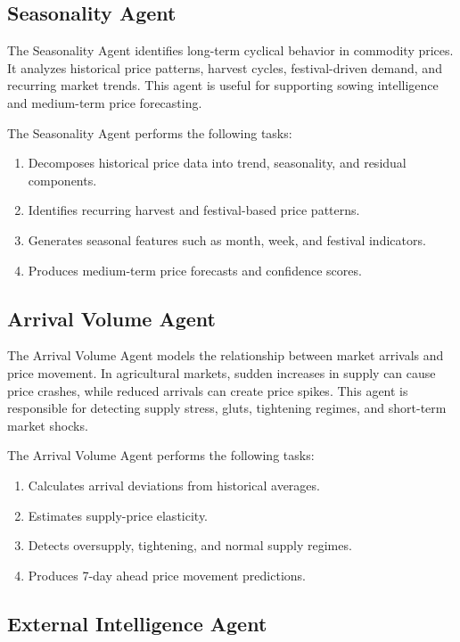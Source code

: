 \documentclass[12pt,a4paper]{report}
\begin{document}
\subsection{Seasonality Agent}

The Seasonality Agent identifies long-term cyclical behavior in commodity prices. It analyzes historical price patterns, harvest cycles, festival-driven demand, and recurring market trends. This agent is useful for supporting sowing intelligence and medium-term price forecasting.

The Seasonality Agent performs the following tasks:

\begin{enumerate}
    \item Decomposes historical price data into trend, seasonality, and residual components.
    \item Identifies recurring harvest and festival-based price patterns.
    \item Generates seasonal features such as month, week, and festival indicators.
    \item Produces medium-term price forecasts and confidence scores.
\end{enumerate}

\subsection{Arrival Volume Agent}

The Arrival Volume Agent models the relationship between market arrivals and price movement. In agricultural markets, sudden increases in supply can cause price crashes, while reduced arrivals can create price spikes. This agent is responsible for detecting supply stress, gluts, tightening regimes, and short-term market shocks.

The Arrival Volume Agent performs the following tasks:

\begin{enumerate}
    \item Calculates arrival deviations from historical averages.
    \item Estimates supply-price elasticity.
    \item Detects oversupply, tightening, and normal supply regimes.
    \item Produces 7-day ahead price movement predictions.
\end{enumerate}

\subsection{External Intelligence Agent}
\end{document}

